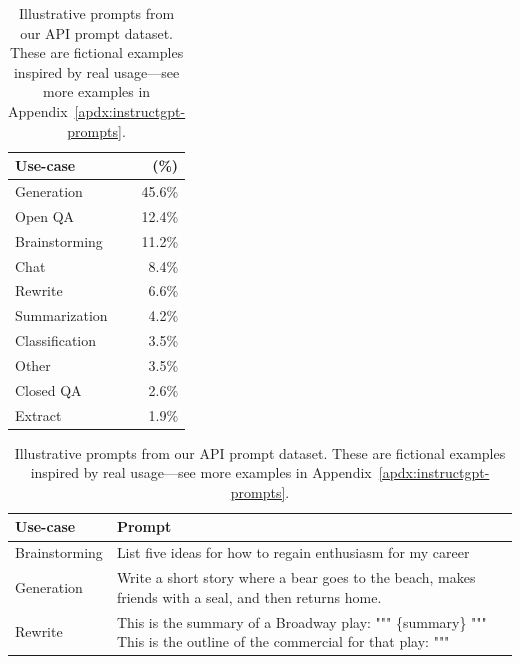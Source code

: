 \documentclass{article}
\begin{document}
\begin{table}
\parbox[t]{.3\linewidth}{
\centering
\footnotesize
\caption{Distribution of use case categories from our API prompt dataset.}
\label{tab:instruction-categories}
\begin{tabular}{lr}
    \toprule
    \textbf{Use-case}        & \textbf{(\%)} \\
    \midrule
    Generation      & 45.6\% \\
    Open QA         & 12.4\% \\
    Brainstorming   & 11.2\% \\
    Chat            &  8.4\% \\
    Rewrite         &  6.6\% \\
    Summarization   &  4.2\% \\
    Classification  &  3.5\% \\
    Other           &  3.5\% \\
    Closed QA       &  2.6\% \\
    Extract         &  1.9\% \\
\bottomrule
\end{tabular}
}
\hfill
\parbox[t]{.65\linewidth}{
\footnotesize
\caption{Illustrative prompts from our API prompt dataset. These are fictional examples inspired by real usage---see more examples in Appendix~\ref{apdx:instructgpt-prompts}.}
\label{tab:illustrative-prompts}
\begin{tabular}{p{} p{}}
\toprule
      \textbf{Use-case} &                                                                                            \textbf{Prompt} \\ \midrule
 Brainstorming &                                                                                                                                                                           List five ideas for how to regain enthusiasm for my career \\ \midrule
 Generation &                                                                                                                                                                                                                                                                                                                        Write a short story where a bear goes to the beach, makes friends with a seal, and then returns home. \\ \midrule
  Rewrite &                                                                                                                                                                                                                                                                                                 This is the summary of a Broadway play:{\newline} """{\newline} \{summary\}{\newline} """{\newline} This is the outline of the commercial for that play:{\newline} """ \\ 
  

\end{tabular}}
\end{table}
\end{document}
